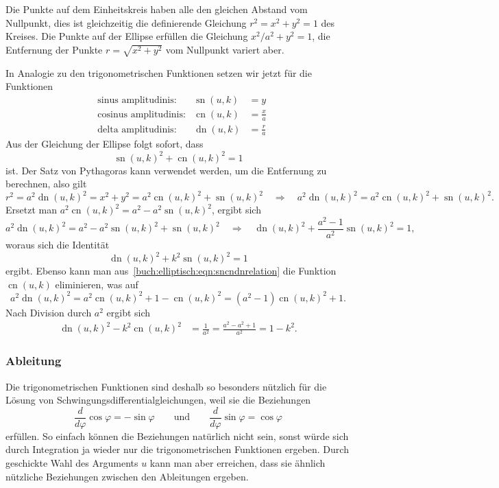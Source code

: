 Die Punkte auf dem Einheitskreis haben alle den gleichen Abstand vom
Nullpunkt, dies ist gleichzeitig die definierende Gleichung $r^2=x^2+y^2=1$
des Kreises.
Die Punkte auf der Ellipse erfüllen die Gleichung $x^2/a^2+y^2=1$,
die Entfernung der Punkte $r=\sqrt{x^2+y^2}$ vom Nullpunkt variert aber.

In Analogie zu den trigonometrischen Funktionen setzen wir jetzt für 
die Funktionen
\[
\begin{aligned}
&\text{sinus amplitudinis:}&
\operatorname{sn}(u,k)&= y \\
&\text{cosinus amplitudinis:}&
\operatorname{cn}(u,k)&= \frac{x}{a} \\
&\text{delta amplitudinis:}&
\operatorname{dn}(u,k)&=\frac{r}{a}
\end{aligned}
\]
Aus der Gleichung der Ellipse folgt sofort, dass
\[
\operatorname{sn}(u,k)^2 + \operatorname{cn}(u,k)^2 = 1
\]
ist.
Der Satz von Pythagoras kann verwendet werden, um die Entfernung zu
berechnen, also gilt
\begin{equation}
r^2
=
a^2 \operatorname{dn}(u,k)^2
=
x^2 + y^2
=
a^2\operatorname{cn}(u,k)^2 + \operatorname{sn}(u,k)^2
\quad
\Rightarrow
\quad
a^2 \operatorname{dn}(u,k)^2
=
a^2\operatorname{cn}(u,k)^2 + \operatorname{sn}(u,k)^2.
\label{buch:elliptisch:eqn:sncndnrelation}
\end{equation}
Ersetzt man
$
a^2\operatorname{cn}(u,k)^2
=
a^2-a^2\operatorname{sn}(u,k)^2
$, ergibt sich
\[
a^2 \operatorname{dn}(u,k)^2
=
a^2-a^2\operatorname{sn}(u,k)^2
+
\operatorname{sn}(u,k)^2
\quad
\Rightarrow
\quad
\operatorname{dn}(u,k)^2
+
\frac{a^2-1}{a^2}\operatorname{sn}(u,k)^2
=
1,
\]
woraus sich die Identität
\[
\operatorname{dn}(u,k)^2 + k^2 \operatorname{sn}(u,k)^2 = 1
\]
ergibt.
Ebenso kann man aus~\eqref{buch:elliptisch:eqn:sncndnrelation}
die Funktion $\operatorname{cn}(u,k)$ eliminieren, was auf
\[
a^2\operatorname{dn}(u,k)^2
=
a^2\operatorname{cn}(u,k)^2
+1-\operatorname{cn}(u,k)^2
=
(a^2-1)\operatorname{cn}(u,k)^2
+1.
\]
Nach Division durch $a^2$ ergibt sich
\begin{align*}
\operatorname{dn}(u,k)^2
-
k^2\operatorname{cn}(u,k)^2
&=
\frac{1}{a^2}
=
\frac{a^2-a^2+1}{a^2}
=
1-k^2.
\end{align*}

%
% 
\subsubsection{Ableitung}
Die trigonometrischen Funktionen sind deshalb so besonders nützlich 
für die Lösung von Schwingungsdifferentialgleichungen, weil sie die
Beziehungen
\[
\frac{d}{d\varphi}  \cos\varphi = -\sin\varphi
\qquad\text{und}\qquad
\frac{d}{d\varphi}  \sin\varphi = \cos\varphi
\]
erfüllen.
So einfach können die Beziehungen natürlich nicht sein, sonst würde sich
durch Integration ja wieder nur die trigonometrischen Funktionen ergeben.
Durch geschickte Wahl des Arguments $u$ kann man aber erreichen, dass
sie ähnlich nützliche Beziehungen zwischen den Ableitungen ergeben.

